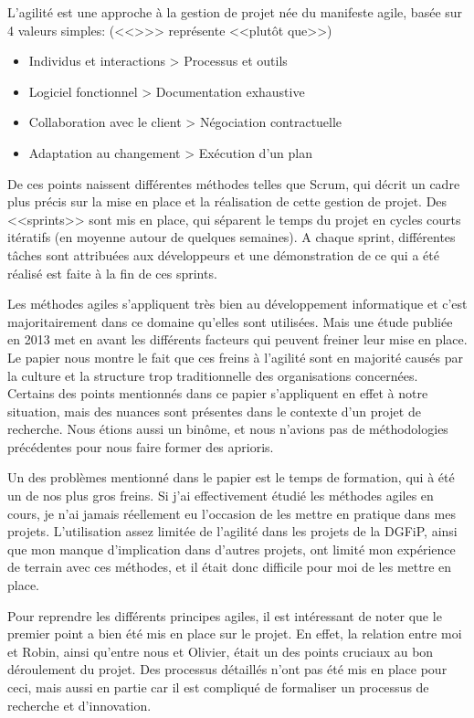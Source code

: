\documentclass[openany, 11pt]{memoir}
\begin{document}
L'agilité est une approche à la gestion de projet née du manifeste agile, basée sur 4 valeurs simples: (<<{>}>> représente <<plutôt que>>)

\begin{itemize}
	\item Individus et interactions > Processus et outils
	\item Logiciel fonctionnel > Documentation exhaustive
	\item Collaboration avec le client > Négociation contractuelle
	\item Adaptation au changement > Exécution d'un plan
\end{itemize}

De ces points naissent différentes méthodes telles que Scrum, qui décrit un cadre plus précis sur la mise en place et la réalisation de cette gestion de projet. Des <<sprints>> sont mis en place, qui séparent le temps du projet en cycles courts itératifs (en moyenne autour de quelques semaines). A chaque sprint, différentes tâches sont attribuées aux développeurs et une démonstration de ce qui a été réalisé est faite à la fin de ces sprints.

\bigskip
Les méthodes agiles s'appliquent très bien au développement informatique et c'est majoritairement dans ce domaine qu'elles sont utilisées. Mais une étude publiée en 2013 \cite{obstacles} met en avant les différents facteurs qui peuvent freiner leur mise en place. Le papier nous montre le fait que ces freins à l'agilité sont en majorité causés par la culture et la structure trop traditionnelle des organisations concernées. Certains des points mentionnés dans ce papier s'appliquent en effet à notre situation, mais des nuances sont présentes dans le contexte d'un projet de recherche. Nous étions aussi un binôme, et nous n'avions pas de méthodologies précédentes pour nous faire former des aprioris.

Un des problèmes mentionné dans le papier est le temps de formation, qui à été un de nos plus gros freins. Si j'ai effectivement étudié les méthodes agiles en cours, je n'ai jamais réellement eu l'occasion de les mettre en pratique dans mes projets. L'utilisation assez limitée de l'agilité dans les projets de la \gls{DGFiP}, ainsi que mon manque d'implication dans d'autres projets, ont limité mon expérience de terrain avec ces méthodes, et il était donc difficile pour moi de les mettre en place.

\bigskip
Pour reprendre les différents principes agiles, il est intéressant de noter que le premier point a bien été mis en place sur le projet. En effet, la relation entre moi et Robin, ainsi qu'entre nous et Olivier, était un des points cruciaux au bon déroulement du projet. Des processus détaillés n'ont pas été mis en place pour ceci, mais aussi en partie car il est compliqué de formaliser un processus de recherche et d'innovation.
\end{document}
